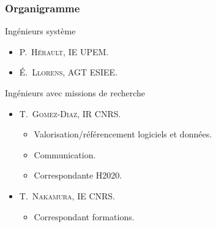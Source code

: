 \documentclass[]{beamer}
\begin{document}

\begin{frame}
  \frametitle{Organigramme}

  \begin{block}{Ingénieurs système}
    \begin{itemize}
      \item \textsc{P.~Hérault}, IE UPEM.
      \item \textsc{\'E.~Llorens}, AGT ESIEE.
    \end{itemize}
  \end{block}

  \begin{block}{Ingénieurs avec missions de recherche}
    \begin{itemize}
      \item \textsc{T.~Gomez-Diaz}, IR CNRS.
        \begin{itemize}
          \item Valorisation/référencement logiciels et données.
          \item Communication.
          \item Correspondante H2020.
        \end{itemize}
      \item \textsc{T.~Nakamura}, IE CNRS.
        \begin{itemize}
          \item Correspondant formations.
        \end{itemize}
    \end{itemize}
  \end{block}

\end{frame}

\end{document}
